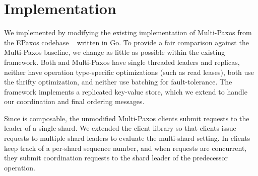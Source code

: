 \section{Implementation}
\label{sec:implementation}

We implemented \sys{} by modifying the existing implementation of Multi-Paxos from the EPaxos codebase ~\cite{moraru2013epaxos} written in Go. To provide a fair comparison against the Multi-Paxos baseline, we change as little as possible within the existing framework. Both \sys{} and Multi-Paxos have single threaded leaders and replicas, neither have operation type-specific optimizations (such as read leases), both use the thrifty optimization, and neither use batching for fault-tolerance. The framework implements a replicated key-value store,
which we extend to handle our coordination and final ordering messages.

Since \sdl{} is composable, the unmodified Multi-Paxos clients submit requests to the leader of a single shard. We extended the client library so that clients issue requests to multiple shard leaders to evaluate the multi-shard setting. In \sys{} clients keep track of a per-shard sequence number, and when requests are concurrent, they submit coordination requests to the shard leader of the  predecessor operation.

